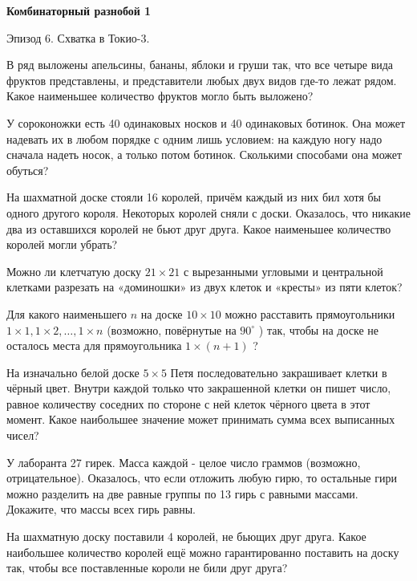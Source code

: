 \centerline{\bf \Huge Комбинаторный разнобой 1}

\begin{flushright}
        \scriptsize{Эпизод 6. Схватка в Токио-3.}
\end{flushright}

В ряд выложены апельсины, бананы, яблоки и груши так, что все четыре вида фруктов представлены, и представители любых двух видов где-то лежат рядом. Какое наименьшее количество фруктов могло быть выложено?

У сороконожки есть 40 одинаковых носков и 40 одинаковых ботинок. Она может надевать их в любом порядке с одним лишь условием: на каждую ногу надо сначала надеть носок, а только потом ботинок. Сколькими способами она может обуться?

На шахматной доске стояли 16 королей, причём каждый из них бил хотя бы одного другого короля. Некоторых королей сняли с доски. Оказалось, что никакие два из оставшихся королей не бьют друг друга. Какое наименьшее количество королей могли убрать?

Можно ли клетчатую доску $21 \times 21$ с вырезанными угловыми и центральной клетками разрезать на «доминошки» из двух клеток и «кресты» из пяти клеток?

Для какого наименьшего $n$ на доске $10 \times 10$ можно расставить прямоугольники $1 \times 1,1 \times 2, \ldots, 1 \times n$ (возможно, повёрнутые на $90^{\circ}$ ) так, чтобы на доске не осталось места для прямоугольника $1 \times(n+1)$ ?

На изначально белой доске $5 \times 5$ Петя последовательно закрашивает клетки в чёрный цвет. Внутри каждой только что закрашенной клетки он пишет число, равное количеству соседних по стороне с ней клеток чёрного цвета в этот момент. Какое наибольшее значение может принимать сумма всех выписанных чисел?

У лаборанта 27 гирек. Масса каждой - целое число граммов (возможно, отрицательное). Оказалось, что если отложить любую гирю, то остальные гири можно разделить на две равные группы по 13 гирь с равными массами. Докажите, что массы всех гирь равны.

На шахматную доску поставили 4 королей, не бьющих друг друга. Какое наибольшее количество королей ещё можно гарантированно поставить на доску так, чтобы все поставленные короли не били друг друга?